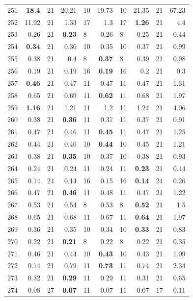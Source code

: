 \begin{longtable}{lr@{\hskip 4pt}l@{\hskip 12pt}r@{\hskip 4pt}l@{\hskip 12pt}r@{\hskip 4pt}l@{\hskip 12pt}r@{\hskip 4pt}l@{\hskip 12pt}r}
251 & \textbf{18.4} & 21 & 20.21 & 10 & 19.73 & 10 & 21.35 & 21 & 67.23 \\
252 & 11.92 & 21 & 1.33 & 17 & 1.3 & 17 & \textbf{1.26} & 21 & 4.4 \\
253 & 0.26 & 21 & \textbf{0.23} & 8 & 0.26 & 8 & 0.25 & 21 & 0.44 \\
254 & \textbf{0.34} & 21 & 0.36 & 10 & 0.35 & 10 & 0.37 & 21 & 0.99 \\
255 & 0.38 & 21 & 0.4 & 8 & \textbf{0.37} & 8 & 0.39 & 21 & 0.98 \\
256 & 0.19 & 21 & 0.19 & 16 & \textbf{0.19} & 16 & 0.2 & 21 & 0.3 \\
257 & \textbf{0.46} & 21 & 0.47 & 11 & 0.47 & 11 & 0.47 & 21 & 1.31 \\
258 & 0.65 & 21 & 0.69 & 11 & \textbf{0.62} & 11 & 0.68 & 21 & 1.97 \\
259 & \textbf{1.16} & 21 & 1.21 & 11 & 1.2 & 11 & 1.24 & 21 & 4.06 \\
260 & 0.38 & 21 & \textbf{0.36} & 11 & 0.37 & 11 & 0.37 & 21 & 0.91 \\
261 & 0.47 & 21 & 0.46 & 11 & \textbf{0.45} & 11 & 0.47 & 21 & 1.25 \\
262 & 0.44 & 21 & 0.46 & 10 & \textbf{0.44} & 10 & 0.45 & 21 & 1.21 \\
263 & 0.38 & 21 & \textbf{0.35} & 10 & 0.37 & 10 & 0.38 & 21 & 0.93 \\
264 & 0.24 & 21 & 0.24 & 11 & 0.24 & 11 & \textbf{0.23} & 21 & 0.44 \\
265 & 0.14 & 24 & 0.14 & 16 & 0.15 & 16 & \textbf{0.14} & 24 & 0.26 \\
266 & 0.47 & 21 & \textbf{0.46} & 11 & 0.48 & 11 & 0.47 & 21 & 1.22 \\
267 & 0.53 & 21 & 0.54 & 8 & 0.53 & 8 & \textbf{0.52} & 21 & 1.5 \\
268 & 0.65 & 21 & 0.68 & 11 & 0.67 & 11 & \textbf{0.64} & 21 & 1.97 \\
269 & 0.36 & 21 & 0.35 & 10 & 0.34 & 10 & \textbf{0.33} & 21 & 0.83 \\
270 & 0.22 & 21 & \textbf{0.21} & 8 & 0.22 & 8 & 0.22 & 21 & 0.35 \\
271 & 0.46 & 21 & 0.44 & 10 & \textbf{0.43} & 10 & 0.43 & 21 & 1.09 \\
272 & 0.74 & 21 & 0.79 & 11 & \textbf{0.73} & 11 & 0.74 & 21 & 2.34 \\
273 & 0.32 & 21 & \textbf{0.29} & 11 & 0.29 & 11 & 0.31 & 21 & 0.65 \\
274 & 0.08 & 27 & \textbf{0.07} & 11 & 0.07 & 11 & 0.07 & 17 & 0.11 \\

\end{longtable}
